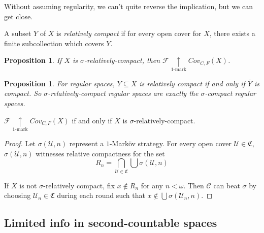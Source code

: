 \documentclass{beamer}
\newtheorem{proposition}[theorem]{Proposition}
\theoremstyle{definition}
\newcommand{\kmarkwin}[1]{\underset{#1\text{-mark}}{\uparrow}}
\newcommand{\mengame}[1]{Cov_{C,F}(#1)}
\newcommand{\cl}[1]{\overline{#1}}
\newcommand{\<}{\langle}
\renewcommand{\>}{\rangle}
\newcommand{\mc}[1]{\mathcal{#1}}
\newcommand{\pl}[1]{\mathscr{#1}}
\newcommand{\term}{\textit}
\begin{document}
\begin{frame}
  Without assuming regularity, we can't quite reverse the implication, but
  we can get close.

  \pause

  \begin{definition}
    A subset $Y$ of $X$ is \term{relatively compact} if for every open cover
    for $X$, there exists a finite subcollection which covers $Y$.
  \end{definition}

  \begin{proposition}
    If $X$ is $\sigma$-relatively-compact, then $\pl F \kmarkwin{1}\mengame X$.
  \end{proposition}

  \pause

  \begin{proposition}
    For regular spaces, $Y\subseteq X$ is relatively compact if and only if
    $\cl Y$ is compact. So $\sigma$-relatively-compact regular spaces are
    exactly the $\sigma$-compact regular spaces.
  \end{proposition}
\end{frame}

\begin{frame}

  \begin{theorem}
    $\pl F \kmarkwin{1}\mengame X$ if and only if $X$ is
    $\sigma$-relatively-compact.
  \end{theorem}

  \pause

  \begin{proof}
    Let $\sigma(\mc U, n)$ represent a $1$-Mark\"ov strategy.
    For every open cover $\mc U\in\mathfrak C$, $\sigma(\mc{U},n)$
    witnesses relative compactness for the set
      \[
        R_n
          =
        \bigcap_{\mc U\in\mathfrak C}\bigcup \sigma(\mc U,n)
      \]

    \pause

    If $X$ is not $\sigma$-relatively compact, fix $x \not\in R_n$ for any
    $n<\omega$. Then $\pl C$ can beat
    $\sigma$ by choosing $\mc{U}_n\in\mathfrak{C}$ during each round
    such that $x\not\in \bigcup\sigma(\mc{U}_n,n)$.
  \end{proof}
\end{frame}

\subsection{Limited info in second-countable spaces}
\end{document}
